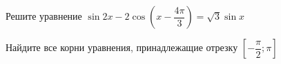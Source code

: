 \begin{ex}
	\begin{condition}
		\begin{enumcols}[label=\asbuk*)]
			\item Решите уравнение \(  \sin 2x-2\cos{\left( x -  \dfrac{4\pi}{3} \right)}= \sqrt{3}\sin x \)
			\item Найдите все корни уравнения, принадлежащие отрезку \( \left[-\dfrac{\pi}{2};\pi\right] \)
		\end{enumcols}
	\end{condition}
\end{ex}